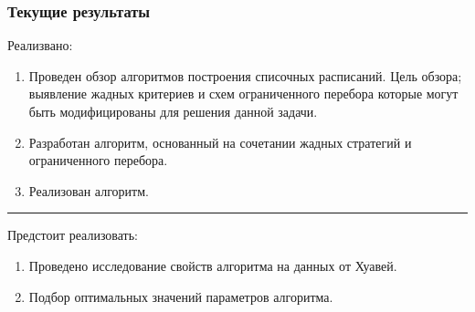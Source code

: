 \begin{frame}
    \frametitle{Текущие результаты}
    Реализвано:
    \begin{enumerate}
        \item Проведен обзор алгоритмов построения списочных расписаний. Цель обзора; выявление жадных критериев и схем ограниченного перебора которые могут быть модифицированы для решения данной задачи.
        \item Разработан алгоритм, основанный на сочетании жадных стратегий и ограниченного перебора.
        \item Реализован алгоритм.
    \end{enumerate}
    \vspace{0.3cm}
    \hrule
    \vspace{0.2cm}
    Предстоит реализовать:
    \begin{enumerate}
        \item Проведено исследование свойств алгоритма на данных от Хуавей.
        \item Подбор оптимальных значений параметров алгоритма.
    \end{enumerate}
\end{frame}